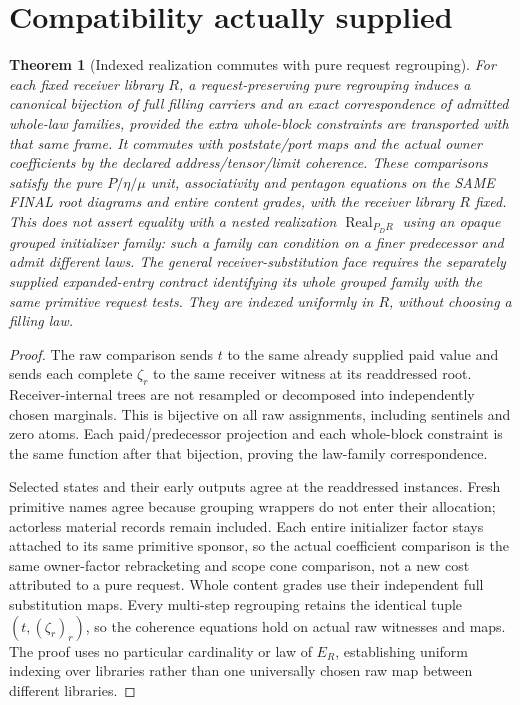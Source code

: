 \documentclass[11pt]{article}
\newtheorem{theorem}{Theorem}\newtheorem{proposition}{Proposition}
\begin{document}
\section{Compatibility actually supplied}
\begin{theorem}[Indexed realization commutes with pure request regrouping]
For each fixed receiver library $R$, a request-preserving pure regrouping induces a canonical bijection of full filling carriers and an exact correspondence of admitted whole-law families, provided the extra whole-block constraints are transported with that same frame. It commutes with poststate/port maps and the actual owner coefficients by the declared address/tensor/limit coherence. These comparisons satisfy the pure $P/\eta/\mu$ unit, associativity and pentagon equations on the SAME FINAL root diagrams and entire content grades, with the receiver library $R$ fixed. This does not assert equality with a nested realization $\operatorname{Real}_{P_D R}$ using an opaque grouped initializer family: such a family can condition on a finer predecessor and admit different laws. The general receiver-substitution face requires the separately supplied expanded-entry contract identifying its whole grouped family with the same primitive request tests. They are indexed uniformly in $R$, without choosing a filling law.
\end{theorem}
\begin{proof}
The raw comparison sends $t$ to the same already supplied paid value and sends each complete $\zeta_r$ to the same receiver witness at its readdressed root. Receiver-internal trees are not resampled or decomposed into independently chosen marginals. This is bijective on all raw assignments, including sentinels and zero atoms. Each paid/predecessor projection and each whole-block constraint is the same function after that bijection, proving the law-family correspondence.

Selected states and their early outputs agree at the readdressed instances. Fresh primitive names agree because grouping wrappers do not enter their allocation; actorless material records remain included. Each entire initializer factor stays attached to its same primitive sponsor, so the actual coefficient comparison is the same owner-factor rebracketing and scope cone comparison, not a new cost attributed to a pure request. Whole content grades use their independent full substitution maps. Every multi-step regrouping retains the identical tuple $(t,(\zeta_r)_r)$, so the coherence equations hold on actual raw witnesses and maps. The proof uses no particular cardinality or law of $E_R$, establishing uniform indexing over libraries rather than one universally chosen raw map between different libraries.\end{proof}
\end{document}
